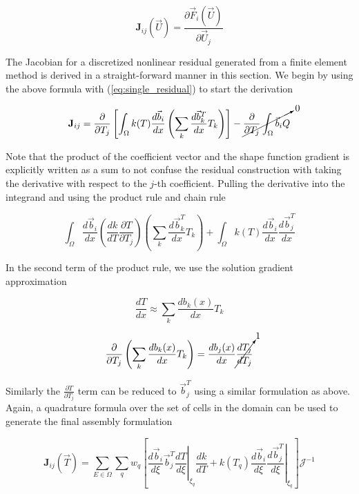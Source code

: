 \documentclass[11pt]{style/memo}
\begin{document}
\begin{equation*}
    \mathbf{J}_{ij}(\vec{U}) = \frac{\partial \vec{F}_i(\vec{U})}{\partial \vec{U}_j}
\end{equation*}

The Jacobian for a discretized nonlinear residual generated from a finite element method is
derived in a straight-forward manner in this section. We begin by using the above formula with
(\ref{eq:single_residual}) to start the derivation

\begin{equation*}
    \mathbf{J}_{ij} = \frac{\partial}{\partial T_j} \left[ 
        \int_\Omega k(T) \frac{d\vec{b}_i}{dx} \left(\sum_k \frac{d\vec{b}_k^T}{dx} T_k \right) \right]
    - \cancelto{0}{ \frac{\partial}{\partial T_j} \int_\Omega \vec{b}_i Q }
\end{equation*}

Note that the product of the coefficient vector and the shape function gradient is explicitly written
as a sum to not confuse the residual construction with taking the derivative with respect to the
$j$-th coefficient. Pulling the derivative into the integrand and using the product rule and chain
rule

\begin{equation}
    \label{eq:single_jacobian}
    \int_\Omega \frac{d\vec{b}_i}{dx} \left( \frac{dk}{dT}\frac{\partial T}{\partial T_j}\right) \left(\sum_k \frac{d\vec{b}_k^T}{dx} T_k \right)
    + \int_\Omega k(T) \frac{d\vec{b}_i}{dx} \frac{d\vec{b}_j^T}{dx}
\end{equation}

In the second term of the product rule, we use the solution gradient approximation

\begin{equation*}
    \frac{dT}{dx} \approx \sum_k \frac{db_k(x)}{dx}T_k
\end{equation*}

\begin{equation*}
    \frac{\partial}{\partial T_j} \left( \sum_k \frac{db_k(x)}{dx}T_k \right) = \frac{db_j(x)}{dx}
    \cancelto{1}{\frac{dT_j}{dT_j} }
\end{equation*}

Similarly the $\frac{\partial T}{\partial T_j}$ term can be reduced to $\vec{b}_j^T$ using a similar formulation
as above. Again, a quadrature formula over the set of cells in the domain can be used to generate the final
assembly formulation

\begin{equation}
    \mathbf{J}_{ij}(\vec{T}) = \sum_{E\in\Omega}\sum_q w_q \left[
        \left. \frac{d\vec{b}_i}{d\xi} \vec{b}_j^T \frac{dT}{d\xi} \right|_{\xi_q} \frac{dk}{dT}
    + k(T_q) \left. \frac{d\vec{b}_i}{d\xi} \frac{d\vec{b}_j^T}{d\xi} \right|_{\xi_q} \right] \mathcal{J}^{-1}
\end{equation}
\end{document}
